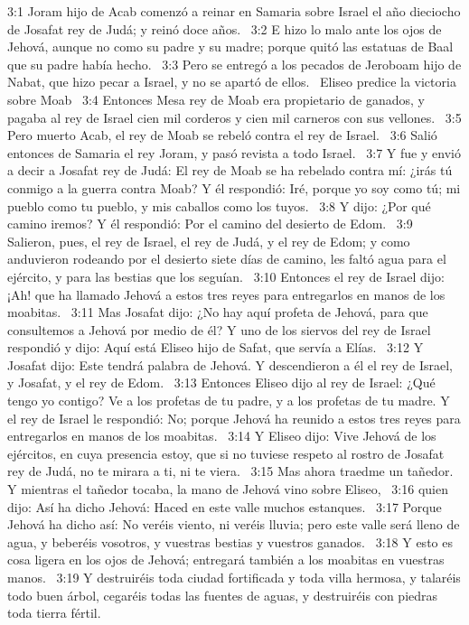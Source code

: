 3:1 Joram hijo de Acab comenzó a reinar en Samaria sobre Israel el año dieciocho de Josafat rey de Judá; y reinó doce años.  
3:2 E hizo lo malo ante los ojos de Jehová, aunque no como su padre y su madre; porque quitó las estatuas de Baal que su padre había hecho.  
3:3 Pero se entregó a los pecados de Jeroboam hijo de Nabat, que hizo pecar a Israel, y no se apartó de ellos.  
Eliseo predice la victoria sobre Moab  
3:4 Entonces Mesa rey de Moab era propietario de ganados, y pagaba al rey de Israel cien mil corderos y cien mil carneros con sus vellones.  
3:5 Pero muerto Acab, el rey de Moab se rebeló contra el rey de Israel.  
3:6 Salió entonces de Samaria el rey Joram, y pasó revista a todo Israel.  
3:7 Y fue y envió a decir a Josafat rey de Judá: El rey de Moab se ha rebelado contra mí: ¿irás tú conmigo a la guerra contra Moab? Y él respondió: Iré, porque yo soy como tú; mi pueblo como tu pueblo, y mis caballos como los tuyos.  
3:8 Y dijo: ¿Por qué camino iremos? Y él respondió: Por el camino del desierto de Edom.  
3:9 Salieron, pues, el rey de Israel, el rey de Judá, y el rey de Edom; y como anduvieron rodeando por el desierto siete días de camino, les faltó agua para el ejército, y para las bestias que los seguían.  
3:10 Entonces el rey de Israel dijo: ¡Ah! que ha llamado Jehová a estos tres reyes para entregarlos en manos de los moabitas.  
3:11 Mas Josafat dijo: ¿No hay aquí profeta de Jehová, para que consultemos a Jehová por medio de él? Y uno de los siervos del rey de Israel respondió y dijo: Aquí está Eliseo hijo de Safat, que servía a Elías.  
3:12 Y Josafat dijo: Este tendrá palabra de Jehová. Y descendieron a él el rey de Israel, y Josafat, y el rey de Edom.  
3:13 Entonces Eliseo dijo al rey de Israel: ¿Qué tengo yo contigo? Ve a los profetas de tu padre, y a los profetas de tu madre. Y el rey de Israel le respondió: No; porque Jehová ha reunido a estos tres reyes para entregarlos en manos de los moabitas.  
3:14 Y Eliseo dijo: Vive Jehová de los ejércitos, en cuya presencia estoy, que si no tuviese respeto al rostro de Josafat rey de Judá, no te mirara a ti, ni te viera.  
3:15 Mas ahora traedme un tañedor. Y mientras el tañedor tocaba, la mano de Jehová vino sobre Eliseo,  
3:16 quien dijo: Así ha dicho Jehová: Haced en este valle muchos estanques.  
3:17 Porque Jehová ha dicho así: No veréis viento, ni veréis lluvia; pero este valle será lleno de agua, y beberéis vosotros, y vuestras bestias y vuestros ganados.  
3:18 Y esto es cosa ligera en los ojos de Jehová; entregará también a los moabitas en vuestras manos.  
3:19 Y destruiréis toda ciudad fortificada y toda villa hermosa, y talaréis todo buen árbol, cegaréis todas las fuentes de aguas, y destruiréis con piedras toda tierra fértil.  
